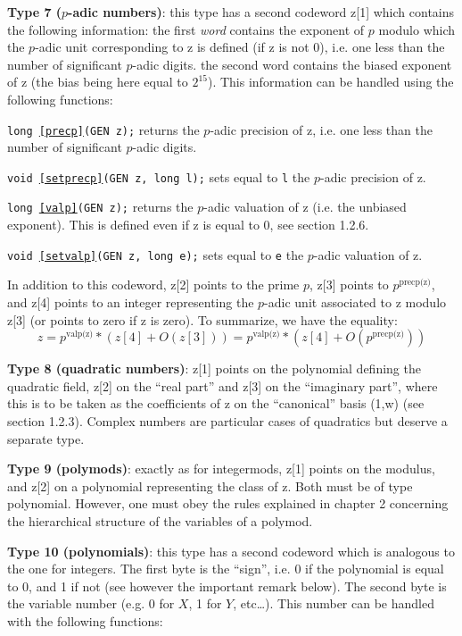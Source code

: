 {\bf Type 7 ($p$-adic numbers)}: 
this type has a second codeword z[1] which
contains the following information: the first {\it word\/} contains the exponent
of $p$ modulo which the $p$-adic unit corresponding to z is defined (if z is not 0),
i.e. one less than the number of significant $p$-adic digits. the second word
contains the biased exponent of z (the bias being here equal to $2^{15}$).
This information can be handled using the following functions:

{\tt long \ref{precp}(GEN z);} returns the $p$-adic precision of z, i.e. one less
than the number of significant $p$-adic digits.

{\tt void \ref{setprecp}(GEN z, long l);} sets equal to {\tt l} the $p$-adic precision of z.

{\tt long \ref{valp}(GEN z);} returns the $p$-adic valuation of z (i.e. the
unbiased exponent). This is defined even if z is equal to 0, see section 1.2.6.

{\tt void \ref{setvalp}(GEN z, long e);} sets equal to {\tt e} the $p$-adic valuation of z.

In addition to this codeword, z[2] points to the prime $p$, z[3] points to
$p^{\text{precp(z)}}$, and z[4] points to an integer representing the $p$-adic
unit associated to z modulo z[3] (or points to zero if z is zero).
To summarize, we have the equality:
$$z=p^{\text{valp(z)}}*(z[4]+O(z[3]))=p^{\text{valp(z)}}*(z[4]+O(p^{\text{precp(z)}}))$$

{\bf Type 8 (quadratic numbers)}: 
z[1] points on the polynomial defining the
quadratic field, z[2] on the ``real part'' and z[3] on the ``imaginary part'',
where this is to be taken as the coefficients of z on the ``canonical'' basis (1,w)
(see section 1.2.3). Complex numbers are particular cases of quadratics but deserve
a separate type.

{\bf Type 9 (polymods)}: 
exactly as for integermods, z[1] points on the modulus,
and z[2] on a polynomial representing the class of z. Both must be of type 
polynomial. However, one must obey the rules explained in chapter 2 concerning
the hierarchical structure of the variables of a polymod.

{\bf Type 10 (polynomials)}: 
this type has a second codeword which is analogous to
the one for integers. The first byte is the ``sign'', i.e. 0 if the polynomial
is equal to 0, and 1 if not (see however the important remark below).
The second byte is the variable number 
(e.g. 0 for $X$, 1 for $Y$, etc\dots). This number can be handled with the 
following functions:

